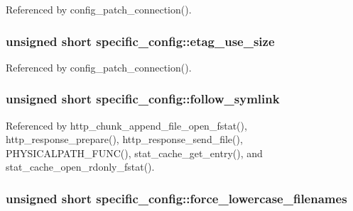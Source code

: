 Referenced by config\-\_\-patch\-\_\-connection().

\hypertarget{structspecific__config_a098935f5506354a9ac54f05ac0f38cce}{
\subsubsection[{etag\-\_\-use\-\_\-size}]{\setlength{\rightskip}{0pt plus 5cm}unsigned short specific\-\_\-config\-::etag\-\_\-use\-\_\-size}}\label{structspecific__config_a098935f5506354a9ac54f05ac0f38cce}


Referenced by config\-\_\-patch\-\_\-connection().

\hypertarget{structspecific__config_acebd4ddb29268c4a82b47c96acf23cad}{
\subsubsection[{follow\-\_\-symlink}]{\setlength{\rightskip}{0pt plus 5cm}unsigned short specific\-\_\-config\-::follow\-\_\-symlink}}\label{structspecific__config_acebd4ddb29268c4a82b47c96acf23cad}


Referenced by http\-\_\-chunk\-\_\-append\-\_\-file\-\_\-open\-\_\-fstat(), http\-\_\-response\-\_\-prepare(), http\-\_\-response\-\_\-send\-\_\-file(), P\-H\-Y\-S\-I\-C\-A\-L\-P\-A\-T\-H\-\_\-\-F\-U\-N\-C(), stat\-\_\-cache\-\_\-get\-\_\-entry(), and stat\-\_\-cache\-\_\-open\-\_\-rdonly\-\_\-fstat().

\hypertarget{structspecific__config_ae311c9dd2c11adab7b26b4d9e0a1053c}{
\subsubsection[{force\-\_\-lowercase\-\_\-filenames}]{\setlength{\rightskip}{0pt plus 5cm}unsigned short specific\-\_\-config\-::force\-\_\-lowercase\-\_\-filenames}}\label{structspecific__config_ae311c9dd2c11adab7b26b4d9e0a1053c}


